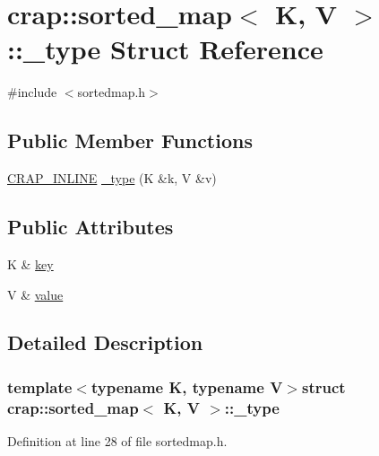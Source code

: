 \hypertarget{structcrap_1_1sorted__map_1_1__type}{\section{crap\+:\+:sorted\+\_\+map$<$ K, V $>$\+:\+:\+\_\+type Struct Reference}
\label{structcrap_1_1sorted__map_1_1__type}
}


{\ttfamily \#include $<$sortedmap.\+h$>$}

\subsection*{Public Member Functions}
\begin{DoxyCompactItemize}
\item 
\hyperlink{config__x86_8h_a5a40526b8d842e7ff731509998bb0f1c}{C\+R\+A\+P\+\_\+\+I\+N\+L\+I\+N\+E} \hyperlink{structcrap_1_1sorted__map_1_1__type_a758a81ef0e3ff03ef8d4f5c9cacb32c5}{\+\_\+type} (K \&k, V \&v)
\end{DoxyCompactItemize}
\subsection*{Public Attributes}
\begin{DoxyCompactItemize}
\item 
K \& \hyperlink{structcrap_1_1sorted__map_1_1__type_a7d7ed4caff3c4092c6a8d75886dd3645}{key}
\item 
V \& \hyperlink{structcrap_1_1sorted__map_1_1__type_a8409b0b8df10fd4513da6f09d53d2ba3}{value}
\end{DoxyCompactItemize}


\subsection{Detailed Description}
\subsubsection*{template$<$typename K, typename V$>$struct crap\+::sorted\+\_\+map$<$ K, V $>$\+::\+\_\+type}



Definition at line 28 of file sortedmap.\+h.



